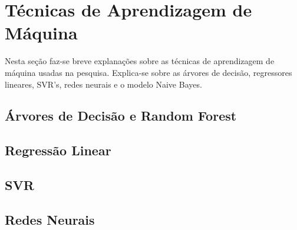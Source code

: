 \section{Técnicas de Aprendizagem de Máquina}
Nesta seção faz-se breve explanações sobre as técnicas de aprendizagem de máquina
usadas na pesquisa. Explica-se sobre as árvores de decisão, regressores lineares,
SVR's, redes neurais e o modelo Naive Bayes.

\subsection{Árvores de Decisão e Random Forest}
\subsection{Regressão Linear}
\subsection{SVR}
\subsection{Redes Neurais}

\section{}
